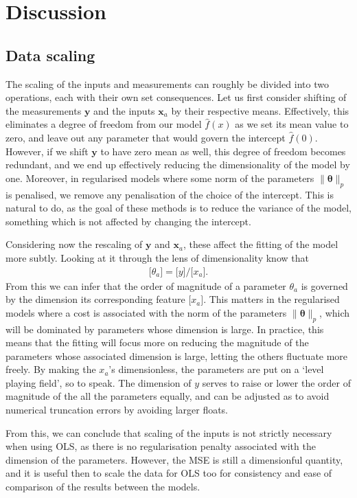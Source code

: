 \documentclass[twocolumn,english,notitlepage]{article}
\renewcommand{\vec}[1]{\boldsymbol{#1}}
\renewcommand{\norm}[2][]{\ensuremath{\|#2\|_{#1}}}
\newcommand{\dimof}[1]{\bigl[#1\bigr]}
\begin{document}
\section{Discussion}
    \subsection{Data scaling}
        The scaling of the inputs and measurements can roughly be divided into two operations, each with their own set consequences. Let us first consider shifting of the measurements $\vec{y}$ and the inputs $\vec{x}_a$ by their respective means. Effectively, this eliminates a degree of freedom from our model $\hat{f}(x)$ as we set its mean value to zero, and leave out any parameter that would govern the intercept $\hat{f}(0)$. However, if we shift $\vec{y}$ to have zero mean as well, this degree of freedom becomes redundant, and we end up effectively reducing the dimensionality of the model by one. Moreover, in regularised models where some norm of the parameters $\norm[p]{\vec{\theta}}$ is penalised, we remove any penalisation of the choice of the intercept. This is natural to do, as the goal of these methods is to reduce the variance of the model, something which is not affected by changing the intercept.

        Considering now the rescaling of $\vec{y}$ and $\vec{x}_a$, these affect the fitting of the model more subtly. Looking at it through the lens of dimensionality know that
        \begin{align}
            \dimof{\theta_a} = \dimof{y} / \dimof{x_a}.
        \end{align}
        From this we can infer that the order of magnitude of a parameter $\theta_a$ is governed by the dimension its corresponding feature $\dimof{x_a}$. This matters in the regularised models where a cost is associated with the norm of the parameters $\norm[p]{\vec{\theta}}$, which will be dominated by parameters whose dimension is large. In practice, this means that the fitting will focus more on reducing the magnitude of the parameters whose associated dimension is large, letting the others fluctuate more freely. By making the $x_a$'s dimensionless, the parameters are put on a `level playing field', so to speak. The dimension of $y$ serves to raise or lower the order of magnitude of the all the parameters equally, and can be adjusted as to avoid numerical truncation errors by avoiding larger floats.

        From this, we can conclude that scaling of the inputs is not strictly necessary when using OLS, as there is no regularisation penalty associated with the dimension of the parameters. However, the MSE is still a dimensionful quantity, and it is useful then to scale the data for OLS too for consistency and ease of comparison of the results between the models.
\end{document}
